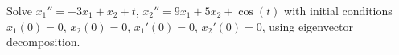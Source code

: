 \documentclass{ximera}
\begin{document}
\begin{exercise}%
    Solve $x_1'' = -3x_1 + x_2 + t$, $x_2'' = 9x_1 + 5x_2 + \cos(t)$ with initial conditions $x_1(0) = 0$, $x_2(0) = 0$, $x_1'(0) = 0$, $x_2'(0) = 0$, using eigenvector decomposition.
\end{exercise}
\end{document}
